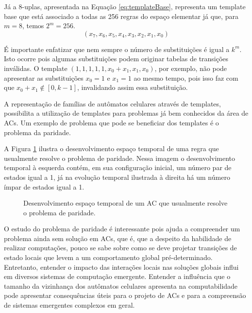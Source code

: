 Já a $8$-uplas, apresentada na Equação \ref{eq:templateBase}, representa um template base que está associado a todas as 256 regras do espaço elementar já que, para $m = 8$, temos $2^m = 256 $.
\begin{equation}
(x_7,x_6,x_5,x_4,x_3,x_2,x_1,x_0)
\label{eq:templateBase}
\end{equation}

É importante enfatizar que nem sempre o número de substituições é igual a $k^m$. Isto ocorre pois algumas substituições podem originar tabelas de transições inválidas. O template $(1,1,1,1,1,x_0+x_1,x_1,x_0)$, por exemplo, não pode apresentar as substituições $x_0=1$ e $x_1=1$ ao mesmo tempo, pois isso faz com que $x_0 + x_1 \notin [0, k-1]$, invalidando assim essa substituição.

A representação de famílias de autômatos celulares através de templates, possibilita a utilização de templates para problemas já bem conhecidos da área de ACs. Um exemplo de problema que pode se beneficiar dos templates é o problema da paridade.

A Figura \ref{fig:parity-rule} ilustra o desenvolvimento espaço temporal de uma regra que usualmente resolve o problema de paridade. Nessa imagem o desenvolvimento temporal à esquerda contém, em sua configuração inicial, um número par de estados igual a 1, já na evolução temporal ilustrada à direita há um número ímpar de estados igual a 1.

\begin{figure}[h!]
\center
{}
\qquad
{}
\caption{Desenvolvimento espaço temporal de um AC que usualmente resolve o problema de paridade.}
\label{fig:parity-rule}
\end{figure}

O estudo do problema de paridade é interessante pois ajuda a compreender um problema ainda sem solução em ACs, que é, que a despeito da habilidade de realizar computações, pouco se sabe sobre como se deve projetar transições de estado locais que levem a um comportamento global pré-determinado. Entretanto, entender o impacto das interações locais nas soluções globais influi em diversos sistemas de computação emergente. Entender a influência que o tamanho da vizinhança dos autômatos celulares apresenta na computabilidade pode apresentar consequências úteis para o projeto de ACs e para a compreensão de sistemas emergentes complexos em geral.

